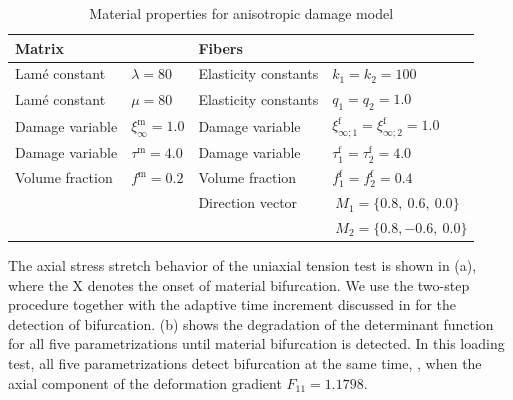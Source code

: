 \documentclass[12pt]{article}
\newcommand{\mtrx}{{\text{m}}}
\newcommand{\fiber}{{\text{f}}}
\numberwithin{equation}{section}
\begin{document}
\begin{table}[htbp]
  \begin{center}
    \begin{tabular}{ l l l l }
      \toprule
      Matrix
      &

      &

      Fibers

      &
      \\
      \midrule
      Lam\'{e} constant
      &
      $\lambda=80$
      &
      Elasticity constants
      &
      $k_1 = k_2 = 100$
      \\
      Lam\'{e} constant
      &
      $\mu = 80$
      &
      Elasticity constants
      &
      $q_1 = q_2 = 1.0$
      \\
      Damage variable
      &
      $\xi^\mtrx_\infty = 1.0$
      &
      Damage variable
      &
      $\xi^\fiber_{\infty;1} = \xi^\fiber_{\infty;2} = 1.0$
      \\
      Damage variable
      &
      $\tau^\mtrx = 4.0$
      &
      Damage variable
      &
      $\tau^\fiber_1 = \tau^\fiber_2 = 4.0$
      \\
      Volume fraction
      &
      $f^\mtrx = 0.2$
      &
      Volume fraction
      &
      $f^\fiber_1 = f^\fiber_2 = 0.4$
      \\
      &

      &
      Direction vector
      &
      $~M_1 = \{ 0.8,~0.6,~0.0\}$
      \\
      &

      &

      &
      $~M_2 = \{ 0.8,-0.6,~0.0\}$
      \\
      \bottomrule
    \end{tabular}
    \caption{Material properties for anisotropic damage model}
    \label{tab:aniso-material}
  \end{center}
\end{table}

The axial stress \vs stretch behavior of the uniaxial tension test is
shown in (a), where the X denotes the
onset of material bifurcation. We use the two-step procedure together
with the adaptive time increment discussed in  for
the detection of bifurcation. (b) shows
the degradation of the determinant function for all five
parametrizations until material bifurcation is detected. In this
loading test, all five parametrizations detect bifurcation at the same
time, \ie, when the axial component of the deformation gradient
$F_{11} = 1.1798$.
\end{document}
